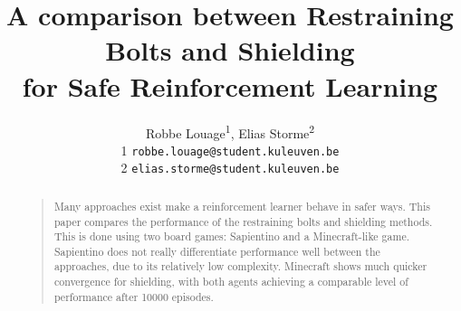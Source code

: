 \documentclass[letterpaper]{article}
\title{ A comparison between Restraining Bolts and Shielding \\ for Safe Reinforcement Learning}
\author{
   Robbe Louage\textsuperscript{1}, Elias Storme\textsuperscript{2}
   \\ 1 \texttt{robbe.louage@student.kuleuven.be}
   \\ 2 \texttt{elias.storme@student.kuleuven.be}
}
\begin{document}
%
\maketitle
\begin{abstract} %
\begin{quote}
Many approaches exist make a reinforcement learner behave in safer ways. This paper compares the performance of the restraining bolts and shielding methods. This is done using two board games: Sapientino and a Minecraft-like game. Sapientino does not really differentiate performance well between the approaches, due to its relatively low complexity. Minecraft shows much quicker convergence for shielding, with both agents achieving a comparable level of performance after 10000 episodes.
\end{quote}
\end{abstract}
\end{document}
